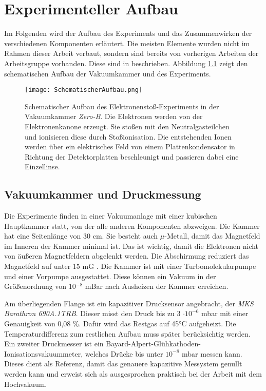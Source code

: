 \chapter{Experimenteller Aufbau}
\label{chap:Aufbau}
Im Folgenden wird der Aufbau des Experiments und das Zusammenwirken der verschiedenen Komponenten erläutert. Die meisten Elemente wurden nicht im Rahmen dieser Arbeit verbaut, sondern sind bereits von vorherigen Arbeiten der Arbeitsgruppe vorhanden. Diese sind in \cite{Holzte} beschrieben. Abbildung \ref{fig:Aufbau} zeigt den schematischen Aufbau der Vakuumkammer und des Experiments.

\begin{landscape}
\begin{figure}
    \centering
    \vspace{-1.5cm}\hspace{-4cm}\texttt{[image: SchematischerAufbau.png]}
    \caption[Schematischer Aufbau des Experiments]{Schematischer Aufbau des Elektronenstoß-Experiments in der Vakuumkammer \textit{Zero-B}. Die Elektronen werden von der Elektronenkanone erzeugt. Sie stoßen mit den Neutralgasteilchen und ionisieren diese durch Stoßionisation. Die entstehenden Ionen werden über ein elektrisches Feld von einem Plattenkondensator in Richtung der Detektorplatten beschleunigt und passieren dabei eine Einzellinse.}
    \label{fig:Aufbau}
\end{figure}
\end{landscape}

\section{Vakuumkammer und Druckmessung}
Die Experimente finden in einer Vakuumanlage mit einer kubischen Hauptkammer statt, von der alle anderen Komponenten abzweigen. Die Kammer hat eine Seitenlänge von 30 cm. Sie besteht auch $\mu$-Metall, damit das Magnetfeld im Inneren der Kammer minimal ist. Das ist wichtig, damit die Elektronen nicht von äußeren Magnetfeldern abgelenkt werden. Die Abschirmung reduziert das Magnetfeld auf unter 15 mG \cite{Holzte}. Die Kammer ist mit einer Turbomolekularpumpe und einer Vorpumpe ausgestattet. Diese können ein Vakuum in der Größenordnung von 10$^{-8}$ mBar nach Ausheizen der Kammer erreichen. 

Am überliegenden Flange ist ein kapazitiver Drucksensor angebracht, der \textit{MKS Barathron 690A.1TRB}. Dieser misst den Druck bis zu 3 $\cdot 10^{-6}$ mbar mit einer Genauigkeit von 0,08 \%. Dafür wird das Restgas auf \ang{45}C aufgeheizt. Die Temperaturdifferenz zum restlichen Aufbau muss später berücksichtig werden. Ein zweiter Druckmesser ist ein Bayard-Alpert-Glühkathoden-Ionisationsvakuummeter, welches Drücke bis unter $10^{-8}$ mbar messen kann. Dieses dient als Referenz, damit das genauere kapazitive Messystem genullt werden kann und erweist sich als ausgesprochen praktisch bei der Arbeit mit dem Hochvakuum.

